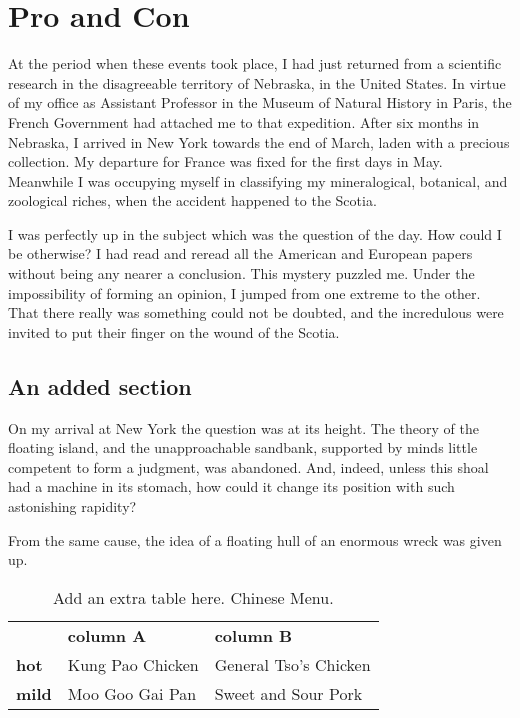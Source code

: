 \chapter{Pro and Con}

At the period when these events took place, I had just returned
from a scientific research in the disagreeable territory
of Nebraska, in the United States.  In virtue of my office
as Assistant Professor in the Museum of Natural History in Paris,
the French Government had attached me to that expedition.
After six months in Nebraska, I arrived in New York towards
the end of March, laden with a precious collection.
My departure for France was fixed for the first days in May.
Meanwhile I was occupying myself in classifying my mineralogical,
botanical, and zoological riches, when the accident happened
to the Scotia.

I was perfectly up in the subject which was the question of the day.
How could I be otherwise?  I had read and reread all the American
and European papers without being any nearer a conclusion.
This mystery puzzled me.  Under the impossibility of forming
an opinion, I jumped from one extreme to the other.
That there really was something could not be doubted,
and the incredulous were invited to put their finger on the wound
of the Scotia.\cite{incollection-full}

\section{An added section}

On my arrival at New York the question was at its height.
The theory of the floating island, and the unapproachable sandbank,
supported by minds little competent to form a judgment, was abandoned.
And, indeed, unless this shoal had a machine in its stomach,
how could it change its position with such astonishing rapidity?

From the same cause, the idea of a floating hull of an enormous
wreck was given up.

\vskip 0.25in
\begin{table}%
 \caption[Add a table]{Add an extra table here. Chinese Menu.}
 \begin{center}
  \begin{tabular}{lp{4.4cm}p{4.4cm}}
                & \textbf{column A} & \textbf{column B} \\
  \textbf{hot}  & Kung Pao Chicken  & General Tso's Chicken \\
  \textbf{mild} & Moo Goo Gai Pan   & Sweet and Sour Pork
  \end{tabular}
  \label{tab:test1}
 \end{center}
\end{table}

